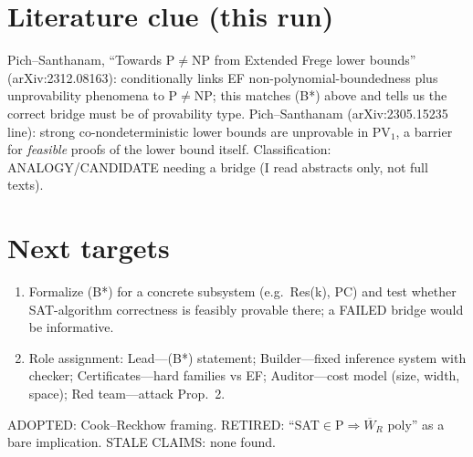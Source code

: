 \documentclass{article}
\begin{document}
\section{Literature clue (this run)}
Pich--Santhanam, ``Towards $\mathrm P\ne\mathrm{NP}$ from Extended Frege lower bounds'' (arXiv:2312.08163): conditionally links EF non-polynomial-boundedness plus unprovability phenomena to P$\ne$NP; this matches (B*) above and tells us the correct bridge must be of provability type. Pich--Santhanam (arXiv:2305.15235 line): strong co-nondeterministic lower bounds are unprovable in PV$_1$, a barrier for \emph{feasible} proofs of the lower bound itself. Classification: ANALOGY/CANDIDATE needing a bridge (I read abstracts only, not full texts).

\section{Next targets}
\begin{enumerate}
\item Formalize (B*) for a concrete subsystem (e.g.\ Res(k), PC) and test whether SAT-algorithm correctness is feasibly provable there; a FAILED bridge would be informative.
\item Role assignment: Lead---(B*) statement; Builder---fixed inference system with checker; Certificates---hard families vs EF; Auditor---cost model (size, width, space); Red team---attack Prop.\ 2.
\end{enumerate}
\noindent ADOPTED: Cook--Reckhow framing. RETIRED: ``SAT$\in$P$\Rightarrow\overline W_R$ poly'' as a bare implication. STALE CLAIMS: none found.
\end{document}

